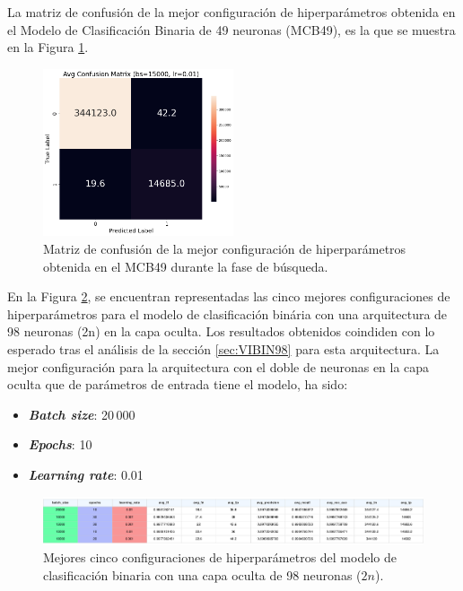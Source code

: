 La matriz de confusión de la mejor configuración de hiperparámetros obtenida en el Modelo de Clasificación Binaria de 49 neuronas (MCB49), es la que se muestra en la Figura \ref{fig:MC_ENT_MCB49}.

\begin{figure}[H]
    \centering
    \includegraphics[width=0.5\textwidth]{./img/modelo/matrices_confusion/MC_ENT_MCB49.png}
    \caption{Matriz de confusión de la mejor configuración de hiperparámetros obtenida en el MCB49 durante la fase de búsqueda.}
    \label{fig:MC_ENT_MCB49}
\end{figure}


En la Figura \ref{fig:BINhs98}, se encuentran representadas las cinco mejores configuraciones de hiperparámetros para el modelo de clasificación binária con una arquitectura de 98 neuronas (2n) en la capa oculta. Los resultados obtenidos coindiden con lo esperado tras el análisis de la sección \ref{sec:VIBIN98} para esta arquitectura. La mejor configuración para la arquitectura con el doble de neuronas en la capa oculta que de parámetros de entrada tiene el modelo, ha sido:
\begin{itemize}
	\item \textbf{\textit{Batch size}}: 20\,000
	\item \textbf{\textit{Epochs}}: 10
	\item \textbf{\textit{Learning rate}}: 0.01
\end{itemize}

\begin{figure}[H]
    \centering
    \includegraphics[width=1\textwidth]{./img/modelo/resultados/BINhs98.pdf}
    \caption{Mejores cinco configuraciones de hiperparámetros del modelo de clasificación binaria con una capa oculta de 98 neuronas ($2n$).}
    \label{fig:BINhs98}
\end{figure}

